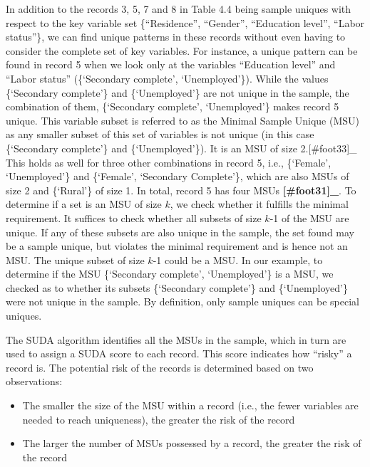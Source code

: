 \documentclass[letterpaper,10pt,english]{sphinxmanual}
\begin{document}
In addition to the records 3, 5, 7 and 8 in Table 4.4 being sample
uniques with respect to the key variable set \{“Residence”, “Gender”,
“Education level”, “Labor status”\}, we can find unique patterns in these
records without even having to consider the complete set of key
variables. For instance, a unique pattern can be found in record 5 when
we look only at the variables “Education level” and “Labor status”
(\{‘Secondary complete’, ‘Unemployed’\}). While the values \{‘Secondary
complete’\} and \{‘Unemployed’\} are not unique in the sample, the
combination of them, \{‘Secondary complete’, ‘Unemployed’\} makes record 5
unique. This variable subset is referred to as the Minimal Sample Unique
(MSU) as any smaller subset of this set of variables is not unique (in
this case \{‘Secondary complete’\} and \{‘Unemployed’\}). It is an MSU of
size 2.{[}\#foot33{]}\_ This holds as well
for three other combinations in record 5, i.e., \{‘Female’, ‘Unemployed’\}
and \{‘Female’, ‘Secondary Complete’\}, which are also MSUs of size 2 and
\{‘Rural’\} of size 1. In total, record 5 has four
MSUs {\color{red}\bfseries{}{[}\#foot31{]}\_}. To determine if a set is an MSU of size
\(k\), we check whether it fulfills the minimal requirement. It
suffices to check whether all subsets of size \(k\)-1 of the MSU are
unique. If any of these subsets are also unique in the sample, the set
found may be a sample unique, but violates the minimal requirement and
is hence not an MSU. The unique subset of size \(k\)-1 could be a
MSU. In our example, to determine if the MSU \{‘Secondary complete’,
‘Unemployed’\} is a MSU, we checked as to whether its subsets \{‘Secondary
complete’\} and \{‘Unemployed’\} were not unique in the sample. By
definition, only sample uniques can be special uniques.

The SUDA algorithm identifies all the MSUs in the sample, which in turn
are used to assign a SUDA score to each record. This score indicates how
“risky” a record is. The potential risk of the records is determined
based on two observations:
\begin{itemize}
\item {} 
The smaller the size of the MSU within a record (i.e., the fewer
variables are needed to reach uniqueness), the greater the risk of
the record

\item {} 
The larger the number of MSUs possessed by a record, the greater the
risk of the record

\end{itemize}
\end{document}
